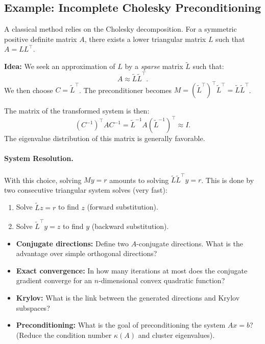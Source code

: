 \subsection{Example: Incomplete Cholesky Preconditioning}

A classical method relies on the Cholesky decomposition. For a symmetric positive definite matrix $A$, there exists a lower triangular matrix $L$ such that $A = L L^\top$.

\textbf{Idea:} We seek an approximation of $L$ by a \emph{sparse} matrix $\tilde{L}$ such that:
\[
A \approx \tilde{L} \tilde{L}^\top.
\]
We then choose $C = \tilde{L}^\top$.
The preconditioner becomes $M = (\tilde{L}^\top)^\top \tilde{L}^\top = \tilde{L} \tilde{L}^\top$.

The matrix of the transformed system is then:
\[
(C^{-1})^\top A C^{-1} = \tilde{L}^{-1} A (\tilde{L}^{-1})^\top \approx I.
\]
The eigenvalue distribution of this matrix is generally favorable.

\paragraph{System Resolution.}
With this choice, solving $M y = r$ amounts to solving $\tilde{L} \tilde{L}^\top y = r$. This is done by two consecutive triangular system solves (very fast):
\begin{enumerate}
    \item Solve $\tilde{L} z = r$ to find $z$ (forward substitution).
    \item Solve $\tilde{L}^\top y = z$ to find $y$ (backward substitution).
\end{enumerate}


\bigskip
\begin{checkpoint}
\begin{itemize}
    \item \textbf{Conjugate directions:} Define two $A$-conjugate directions. What is the advantage over simple orthogonal directions?
    \item \textbf{Exact convergence:} In how many iterations at most does the conjugate gradient converge for an $n$-dimensional convex quadratic function?
    \item \textbf{Krylov:} What is the link between the generated directions and Krylov subspaces?
    \item \textbf{Preconditioning:} What is the goal of preconditioning the system $Ax=b$? (Reduce the condition number $\kappa(A)$ and cluster eigenvalues).
\end{itemize}
\end{checkpoint}
